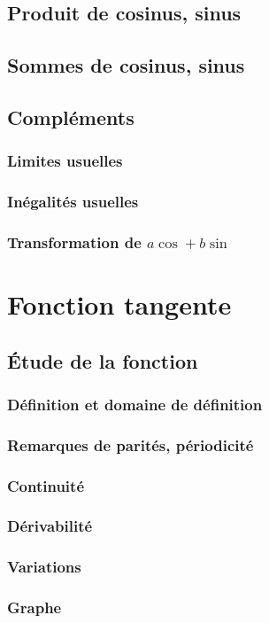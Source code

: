 \documentclass[12pt,a4paper,french]{book}
\begin{document}
		\subsection{Produit de cosinus, sinus}
		\subsection{Sommes de cosinus, sinus}
		\subsection{Compléments}
			\subsubsection{Limites usuelles}
			\subsubsection{Inégalités usuelles}
			\subsubsection{Transformation de $a\cos + b\sin$}
	\section{Fonction tangente}
		\subsection{Étude de la fonction}
			\subsubsection{Définition et domaine de définition}
			\subsubsection{Remarques de parités, périodicité}
			\subsubsection{Continuité}
			\subsubsection{Dérivabilité}
			\subsubsection{Variations}
			\subsubsection{Graphe}
\end{document}
